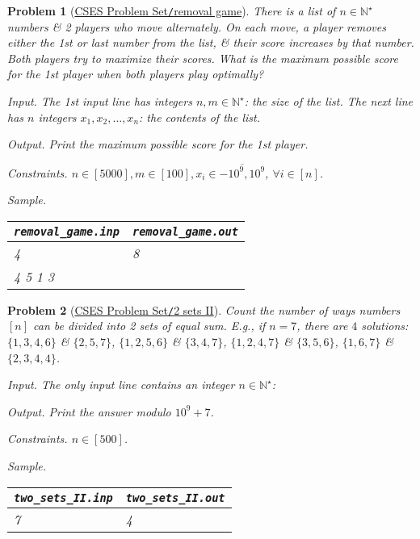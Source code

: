 \documentclass{article}
\newtheorem{problem}{Problem}
\begin{document}
\begin{problem}[\href{https://cses.fi/problemset/task/1097}{CSES Problem Set{\tt/}removal game}]
	There is a list of $n\in\mathbb{N}^\star$ numbers \& 2 players who move alternately. On each move, a player removes either the 1st or last number from the list, \& their score increases by that number. Both players try to maximize their scores. What is the maximum possible score for the 1st player when both players play optimally?
	\item {\sf Input.} The 1st input line has integers $n,m\in\mathbb{N}^\star$: the size of the list. The next line has $n$ integers $x_1,x_2,\ldots,x_n$: the contents of the list.
	\item {\sf Output.} Print the maximum possible score for the 1st player.
	\item {\sf Constraints.} $n\in[5000],m\in[100],x_i\in\overline{-10^9,10^9}$, $\forall i\in[n]$.
	\item {\sf Sample.}
	\begin{table}[H]
		\centering
		\begin{tabular}{|l|l|}
			\hline
			\verb|removal_game.inp| & \verb|removal_game.out| \\
			\hline
			4 & 8 \\
			4 5 1 3 & \\
			\hline
		\end{tabular}
	\end{table}
\end{problem}

\begin{problem}[\href{https://cses.fi/problemset/task/1093}{CSES Problem Set{\tt/}2 sets II}]
	Count the number of ways numbers $[n]$ can be divided into 2 sets of equal sum. E.g., if $n = 7$, there are $4$ solutions: $\{1,3,4,6\}$ \& $\{2,5,7\}$, $\{1,2,5,6\}$ \& $\{3,4,7\}$, $\{1,2,4,7\}$ \& $\{3,5,6\}$, $\{1,6,7\}$ \& $\{2,3,4,4\}$.
	\item {\sf Input.} The only input line contains an integer $n\in\mathbb{N}^\star$: 
	\item {\sf Output.} Print the answer modulo $10^9 + 7$.
	\item {\sf Constraints.} $n\in[500]$.
	\item {\sf Sample.}
	\begin{table}[H]
		\centering
		\begin{tabular}{|l|l|}
			\hline
			\verb|two_sets_II.inp| & \verb|two_sets_II.out| \\
			\hline
			7 & 4 \\
			\hline
		\end{tabular}
	\end{table}
\end{problem}
\end{document}
